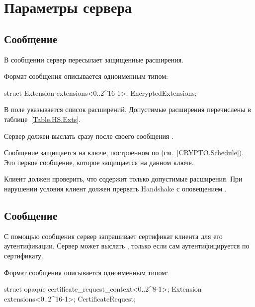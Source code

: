 \section{Параметры сервера}\label{HS.Params} 

\subsection{Сообщение }\label{HS.EE} 

В сообщении  сервер пересылает защищенные расширения.

Формат сообщения описывается одноименным типом:
%
\begin{codeblock}
struct {
  Extension extensions<0..2^16-1>;
} EncryptedExtensions;
\end{codeblock}

В поле  указывается список расширений. Допустимые расширения 
перечислены в таблице~\ref{Table.HS.Exts}.

Сервер должен выслать  сразу после своего сообщения 
. 

Сообщение  защищается на ключе, построенном по 
 (см.~\ref{CRYPTO.Schedule}). Это первое 
сообщение, которое защищается на данном ключе.

Клиент должен проверить, что  содержит только 
допустимые расширения. При нарушении условия клиент должен прервать Handshake
с оповещением .

\subsection{Сообщение }\label{HS.CR} 

С помощью сообщения  сервер запрашивает сертификат 
клиента для его аутентификации. Сервер может выслать , 
только если сам аутентифицируется по сертификату.

Формат сообщения  описывается одноименным типом:
%
\begin{codeblock}
struct {
  opaque certificate_request_context<0..2^8-1>;
  Extension extensions<0..2^16-1>;
 } CertificateRequest;
\end{codeblock}


